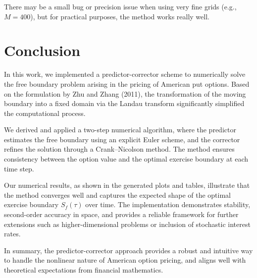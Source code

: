 \documentclass{article}
\begin{document}
There may be a small bug or precision issue when using very fine grids (e.g., $M=400$), but for practical purposes, the method works really well.

\section{Conclusion}

In this work, we implemented a predictor-corrector scheme to numerically solve the free boundary problem arising in the pricing of American put options. Based on the formulation by Zhu and Zhang (2011), the transformation of the moving boundary into a fixed domain via the Landau transform significantly simplified the computational process.

We derived and applied a two-step numerical algorithm, where the predictor estimates the free boundary using an explicit Euler scheme, and the corrector refines the solution through a Crank–Nicolson method. The method ensures consistency between the option value and the optimal exercise boundary at each time step.

Our numerical results, as shown in the generated plots and tables, illustrate that the method converges well and captures the expected shape of the optimal exercise boundary $S_f(\tau)$ over time. The implementation demonstrates stability, second-order accuracy in space, and provides a reliable framework for further extensions such as higher-dimensional problems or inclusion of stochastic interest rates.

In summary, the predictor-corrector approach provides a robust and intuitive way to handle the nonlinear nature of American option pricing, and aligns well with theoretical expectations from financial mathematics.
\end{document}
